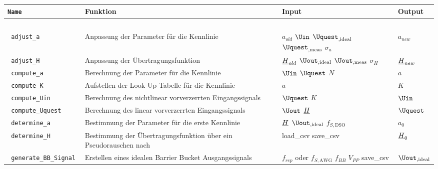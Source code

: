 \documentclass[../Report.tex]{subfiles}
\begin{document}
\begin{table}[H]
\centering 
\begin{tabular}[t]{| >{\texttt\bgroup}m{3.5cm}<{\egroup}|m{8cm}|m{2cm}|m{2cm}|} 
  \hline
    \textrm{\textbf{Name}} & \textbf{Funktion} & \textbf{Input} & \textbf{Output} \\ 
  \hline \hline
    \multicolumn{4}{|c|}{\textbf{blocks}} \\
  \hline \hline
  adjust\_a & Anpassung der Parameter für die Kennlinie & $a_{old}$ \newline $\Uin$ \newline $\Uquest_{,\textrm{ideal}}$ \newline $\Uquest_{,\textrm{meas}}$ \newline $\sigma_a$ & $a_{new}$\\
  \hline
  adjust\_H & Anpassung der Übertragungsfunktion & $\underline{H}_{old}$ \newline $\Uout_{,\textrm{ideal}}$ \newline $\Uout_{,\textrm{meas}}$ \newline $\sigma_H$ & $\underline{H}_{new}$\\
  \hline
  compute\_a & Berechnung der Parameter für die Kennlinie & $\Uin$ \newline $\Uquest$ \newline $N$ & $a$\\
  \hline
  compute\_K & Aufstellen der Look-Up Tabelle für die Kennlinie & $a$ & $K$\\
  \hline
  compute\_Uin & Berechnung des nichtlinear vorverzerrten Eingangssignals & $\Uquest$ \newline $K$ & $\Uin$\\
  \hline
  compute\_Uquest & Berechnung des linear vorverzerrten Eingangssignals & $\Uout$ \newline $\underline{H}$ & $\Uquest$\\
  \hline
  determine\_a & Bestimmung der Parameter für die erste Kennlinie & $\underline{H}$ \newline $\Uout_{,\textrm{ideal}}$ \newline $f_{S,\textrm{DSO}}$ & $a_0$\\
  \hline
  determine\_H & Bestimmung der Übertragungsfunktion über ein Pseudorauschen nach \cite{PJS_Denys} & load\_csv \newline save\_csv  & $\underline{H}_0$\\
  \hline
  generate\_BB\_Signal & Erstellen eines idealen Barrier Bucket Ausgangssignals & $f_{rep}$ oder $f_{S,\textrm{AWG}}$ \newline $f_{BB}$ \newline $V_{PP}$ \newline save\_csv & $\Uout_{,\textrm{ideal}}$\\

\end{tabular}
\end{table}
\end{document}
